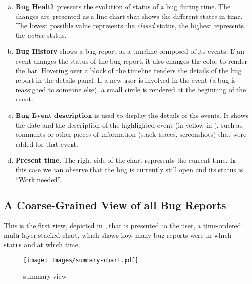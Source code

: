 \begin{enumerate}[(a)]

\item \label{item-ecg} \textbf{Bug Health} presents the evolution of status of a bug during time. The changes are presented as a line chart that shows the different states in time. The lowest possible value represents the \textit{closed} status, the highest represents the \textit{active} status.

\item \label{item-timeline} \textbf{Bug History} shows a bug report as a timeline composed of its events. If an event changes the status of the bug report, it also changes the color to render the bar. Hovering over a block of the timeline renders the details of the bug report in the details panel. If a new user is involved in the event (\eg a bug is reassigned to someone else), a small circle is rendered at the beginning of the event.

\item \label{item-description} \textbf{Bug Event description} is used to display the details of the events. It shows the date and the description of the highlighted event (in yellow in ), such as comments or other pieces of information (\eg stack traces, screenshots) that were added for that event.

\item \textbf{Present time}. The right side of the chart represents the current time. In this case we can observe that the bug is currently still open and its status is ``Work needed''.

\end{enumerate}

\subsection{A Coarse-Grained View of all Bug Reports}

This is the first view, depicted in , that is presented to the user, a time-ordered multi-layer stacked chart, which shows how many bug reports were in which status and at which time.

\begin{figure}[ht]
\centering
\texttt{[image: Images/summary-chart.pdf]}
\caption{\ib summary view}
\label{fig-inbug-resume}
\end{figure}

